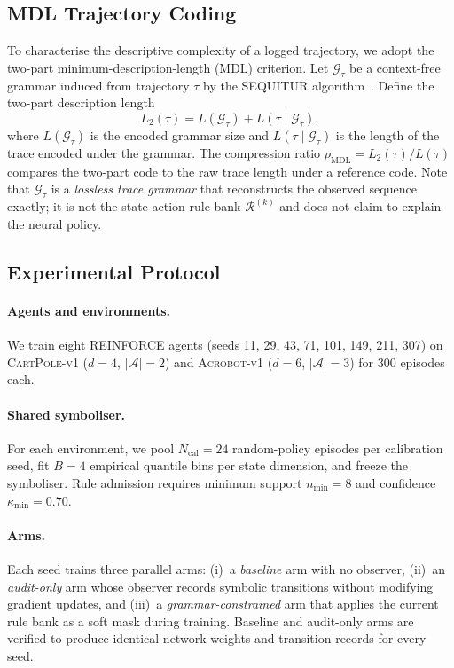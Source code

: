\documentclass[12pt]{article}
\newcommand{\cA}{\mathcal{A}}       %
\newcommand{\cR}{\mathcal{R}}       %
\newcommand{\cG}{\mathcal{G}}       %
\begin{document}
\subsection{MDL Trajectory Coding}
\label{sec:method:mdl}

To characterise the descriptive complexity of a logged trajectory, we
adopt the two-part minimum-description-length (MDL) criterion.
Let $\cG_\tau$ be a context-free grammar induced from trajectory $\tau$
by the SEQUITUR algorithm~\citep{nevill1997sequitur}.
Define the two-part description length
\begin{equation}
\label{eq:mdl}
L_2(\tau) = L(\cG_\tau) + L(\tau \mid \cG_\tau),
\end{equation}
where $L(\cG_\tau)$ is the encoded grammar size and
$L(\tau \mid \cG_\tau)$ is the length of the trace encoded under the grammar.
The compression ratio $\rho_{\mathrm{MDL}} = L_2(\tau) / L(\tau)$
compares the two-part code to the raw trace length under a reference code.
Note that $\cG_\tau$ is a \emph{lossless trace grammar} that reconstructs
the observed sequence exactly; it is not the state-action rule bank
$\cR^{(k)}$ and does not claim to explain the neural policy.

\subsection{Experimental Protocol}
\label{sec:method:protocol}

\paragraph{Agents and environments.}
We train eight REINFORCE agents (seeds 11, 29, 43, 71, 101, 149, 211, 307)
on \textsc{CartPole-v1} ($d=4$, $|\cA|=2$) and \textsc{Acrobot-v1}
($d=6$, $|\cA|=3$) for 300 episodes each.

\paragraph{Shared symboliser.}
For each environment, we pool $N_{\mathrm{cal}} = 24$ random-policy episodes
per calibration seed, fit $B = 4$ empirical quantile bins per state
dimension, and freeze the symboliser.
Rule admission requires minimum support $n_{\min} = 8$ and confidence
$\kappa_{\min} = 0.70$.

\paragraph{Arms.}
Each seed trains three parallel arms: (i)~a \emph{baseline} arm with no
observer, (ii)~an \emph{audit-only} arm whose observer records symbolic
transitions without modifying gradient updates, and (iii)~a
\emph{grammar-constrained} arm that applies the current rule bank as a
soft mask during training.
Baseline and audit-only arms are verified to produce identical network
weights and transition records for every seed.
\end{document}
